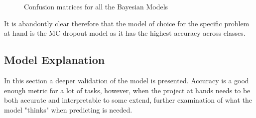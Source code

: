 \documentclass[11pt,twoside]{article}
\numberwithin{Theorem}{section}
\numberwithin{Definition}{section}
\numberwithin{Lemma}{section}
\numberwithin{Algorithm}{section}
\numberwithin{equation}{section}
\begin{document}
\begin{figure}[!h]
    \centering
    \caption{Confusion matrices for all the Bayesian Models}
    \label{fig:confmat_byaesian}
\end{figure}

It is abandontly clear therefore that the model of choice for the specific problem at hand is the MC dropout model as it has the highest accuracy across classes. 

\subsection{Model Explanation}
\label{sec:explanation}

In this section a deeper validation of the model is presented. Accuracy is a good enough metric for a lot of tasks, however, when the project at hands needs to be both accurate and interpretable to some extend, further examination of what the model "thinks" when predicting is needed. 
\end{document}

